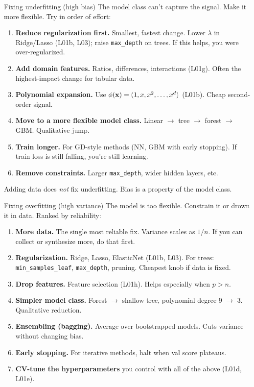 \documentclass[aspectratio=169]{beamer}
\begin{document}
\begin{frame}{Fixing underfitting (high bias)}
  The model class can't capture the signal. Make it more flexible. Try in order of effort:
  \vfill
  \begin{enumerate}
    \item \textbf{Reduce regularization first.} Smallest, fastest change. Lower $\lambda$ in Ridge/Lasso (L01b, L03); raise \texttt{max\_depth} on trees. If this helps, you were over-regularized.
    \item \textbf{Add domain features.} Ratios, differences, interactions (L01g). Often the highest-impact change for tabular data.
    \item \textbf{Polynomial expansion.} Use $\phi(\mathbf{x}) = (1, x, x^2, \ldots, x^d)$ (L01b). Cheap second-order signal.
    \item \textbf{Move to a more flexible model class.} Linear $\to$ tree $\to$ forest $\to$ GBM. Qualitative jump.
    \item \textbf{Train longer.} For GD-style methods (NN, GBM with early stopping). If train loss is still falling, you're still learning.
    \item \textbf{Remove constraints.} Larger \texttt{max\_depth}, wider hidden layers, etc.
  \end{enumerate}
  \vfill
  \footnotesize Adding data does \emph{not} fix underfitting. Bias is a property of the model class.
\end{frame}

\begin{frame}{Fixing overfitting (high variance)}
  The model is too flexible. Constrain it or drown it in data. Ranked by reliability:
  \vfill
  \begin{enumerate}
    \item \textbf{More data.} The single most reliable fix. Variance scales as $1/n$. If you can collect or synthesize more, do that first.
    \item \textbf{Regularization.} Ridge, Lasso, ElasticNet (L01b, L03). For trees: \texttt{min\_samples\_leaf}, \texttt{max\_depth}, pruning. Cheapest knob if data is fixed.
    \item \textbf{Drop features.} Feature selection (L01h). Helps especially when $p > n$.
    \item \textbf{Simpler model class.} Forest $\to$ shallow tree, polynomial degree 9 $\to$ 3. Qualitative reduction.
    \item \textbf{Ensembling (bagging).} Average over bootstrapped models. Cuts variance without changing bias.
    \item \textbf{Early stopping.} For iterative methods, halt when val score plateaus.
    \item \textbf{CV-tune the hyperparameters} you control with all of the above (L01d, L01e).
  \end{enumerate}
\end{frame}
\end{document}
